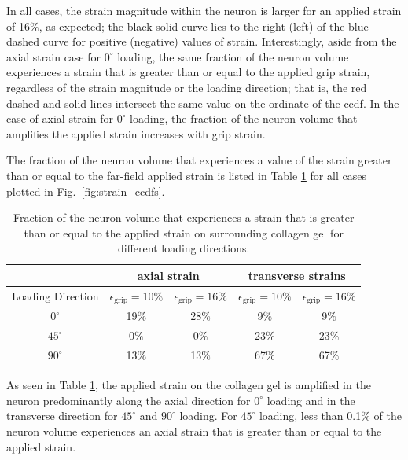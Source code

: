 \documentclass[]{interact}
\begin{document}
In all cases, the strain magnitude within the neuron is larger for an applied strain of 16$\%$, as expected; the black solid curve lies to the right (left) of the blue dashed curve for positive (negative) values of strain. Interestingly, aside from the axial strain case for $0^{\circ}$ loading, the same fraction of the neuron volume experiences a strain that is greater than or equal to the applied grip strain, regardless of the strain magnitude or the loading direction; that is, the red dashed and solid lines intersect the same value on the ordinate of the ccdf. In the case of axial strain for $0^{\circ}$ loading, the fraction of the neuron volume that amplifies the applied strain increases with grip strain. 

The fraction of the neuron volume that experiences a value of the strain greater than or equal to the far-field applied strain is listed in Table \ref{table:ccdf_volfrac_compare} for all cases plotted in Fig.\ \ref{fig:strain_ccdfs}.
%
\begin{table}[ht]
\begin{center}
\begin{tabular}{ c c c c c }
\hline\hline
& \multicolumn{2}{c}{axial strain} & \multicolumn{2}{c}{transverse strains} \\ \hline 
Loading Direction & $\epsilon_{\text{grip}}=10\%$ & $\epsilon_{\text{grip}}=16\%$ & $\epsilon_{\text{grip}}=10\%$ & $\epsilon_{\text{grip}}=16\%$ \\
\hline 
$0^{\circ}$ & 19$\%$ & 28$\%$ & 9$\%$ & 9$\%$\\ 
$45^{\circ}$ & 0$\%$ & 0$\%$ & 23$\%$ & 23$\%$\\
$90^{\circ}$ & 13$\%$ & 13$\%$ & 67$\%$ & 67$\%$\\ \hline \hline
\end{tabular}
\end{center}
\caption{Fraction of the neuron volume that experiences a strain that is greater than or equal to the applied strain on surrounding collagen gel for different loading directions.}
\label{table:ccdf_volfrac_compare}
\end{table}
%
As seen in Table \ref{table:ccdf_volfrac_compare}, the applied strain on the collagen gel is amplified in the neuron predominantly along the axial direction for $0^{\circ}$ loading and in the transverse direction for $45^{\circ}$ and $90^{\circ}$ loading. For $45^{\circ}$ loading, less than 0.1$\%$ of the neuron volume experiences an axial strain that is greater than or equal to the applied strain.
\end{document}
